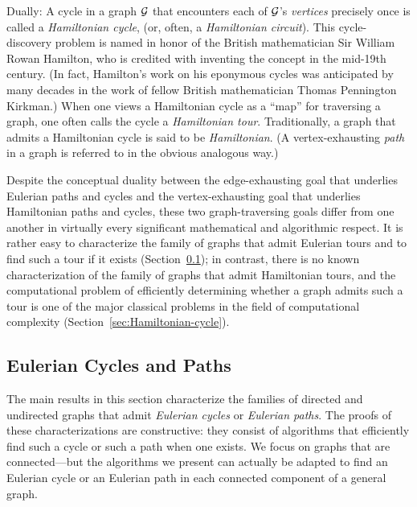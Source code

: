  
 
 
Dually: A cycle in a graph $\mbox{$\cal G$}$ that encounters each of $\mbox{$\cal G$}$'s {\em vertices}
precisely once is called a {\it Hamiltonian cycle}, (or, often, a {\it Hamiltonian circuit}).  
This cycle-discovery problem is named in honor of the British mathematician 
Sir William Rowan Hamilton, who is credited with inventing the
concept in the mid-19th century.  (In fact, Hamilton's work on his eponymous cycles
was anticipated by many decades in the work of fellow British mathematician 
Thomas Pennington Kirkman.)  When one views a Hamiltonian cycle as a ``map'' for 
traversing a graph, one often calls the cycle a {\it Hamiltonian tour}.  Traditionally, a graph
that admits a Hamiltonian cycle is said to be {\it Hamiltonian}.  (A vertex-exhausting {\em path} 
in a graph is referred to in the obvious analogous way.)  
  

\medskip

Despite the conceptual duality between the edge-exhausting goal that underlies Eulerian 
paths and cycles and the vertex-exhausting goal that underlies Hamiltonian paths and cycles,
these two graph-traversing goals differ from one another in virtually every significant
mathematical and algorithmic respect.  It is rather easy to characterize the family of graphs that
admit Eulerian tours and to find such a tour if it exists (Section~\ref{sec:EulerianCycle}); in 
contrast, there is no known characterization of the family of graphs that admit Hamiltonian tours,
and the computational problem of efficiently determining whether a graph admits such a tour is 
one of the major classical problems in the
field of computational complexity  (Section~\ref{sec:Hamiltonian-cycle}).


\subsection{Eulerian Cycles and Paths}
\label{sec:EulerianCycle}

The main results in this section characterize the families of directed and undirected graphs
that admit {\it Eulerian cycles} or {\it Eulerian paths}.  The proofs of these characterizations are
constructive: they consist of algorithms that efficiently find such a cycle or such a path when 
one exists.  We focus on graphs that are connected---but the algorithms we present can actually be 
adapted to find an Eulerian cycle or an Eulerian path in each connected component of a general
graph.

